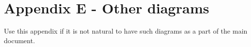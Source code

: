 \section{Appendix E - Other diagrams}
Use this appendix if it is not natural to have such diagrams as a part of the main document.

\pagebreak
